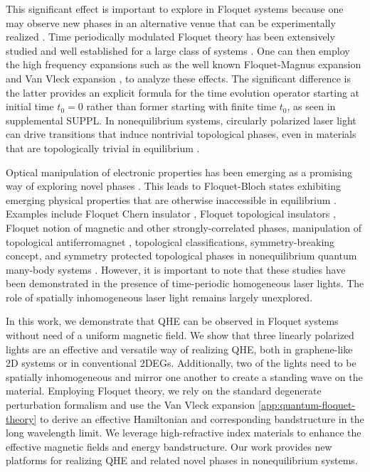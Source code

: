 \documentclass[aps,prb,twocolumn,showpacs,superscriptaddress]{revtex4-2}
\begin{document}
This significant effect is important to explore in Floquet systems \cite{NHL, AEE} because one may observe new phases in an alternative venue that can be experimentally realized \cite{MCR, YHW, HZJ, JWM,merboldtObservationFloquetStates2024, choiDirectObservationFloquetBloch2025}.
Time periodically modulated Floquet theory has been extensively studied and well established for a large class of systems \cite{JHS,HSA,MGP,MBL,AEE,NGJ}.
One can then employ the high frequency expansions \cite{MBL,AEE,NGJ,SRI,API,TMS,ESM,TKT,ALA} such as the well known Floquet-Magnus expansion \cite{ESM,TKT,ALA,FCA} and Van Vleck expansion \cite{MBL,AEE}, to analyze these effects.
The significant difference is the latter provides an explicit formula for the time evolution operator starting at initial time $t_{0}=0$ rather than former starting with finite time $t_{0}$, as seen in supplemental SUPPL.
In nonequilibrium systems, circularly polarized laser light can drive transitions that induce nontrivial topological phases, even in materials that are topologically trivial in equilibrium \cite{TKO}.

Optical manipulation of electronic properties has been emerging as a promising way of exploring novel phases \cite{AKA, JHM}.
This leads to Floquet-Bloch states exhibiting emerging physical properties that are otherwise inaccessible in equilibrium \cite{LST}.
Examples include Floquet Chern insulator \cite{AGG}, Floquet topological insulators \cite{rudnerBandStructureEngineering2020}, Floquet notion of magnetic and other strongly-correlated phases\cite{rudnerBandStructureEngineering2020}, manipulation of topological antiferromagnet \cite{bielinskiFloquetBlochManipulation2025}, topological classifications, symmetry-breaking concept, and symmetry protected topological phases in nonequilibrium quantum many-body systems \cite{EKM, rudnerBandStructureEngineering2020}.
However, it is important to note that these studies have been demonstrated in the presence of time-periodic homogeneous laser lights.
The role of spatially inhomogeneous laser light \cite{SWP1, SWP2, SWP3, SWP4, SWP5} remains largely unexplored.

In this work, we demonstrate that QHE can be observed in Floquet systems without need of a uniform magnetic field.
We show that three linearly polarized lights are an effective and versatile way of realizing QHE, both in graphene-like 2D systems or in conventional 2DEGs.
Additionally, two of the lights need to be spatially inhomogeneous and mirror one another to create a standing wave on the material.
Employing Floquet theory, we rely on the standard degenerate perturbation formalism and use the Van Vleck expansion \ref{app:quantum-floquet-theory} \cite{MBL, AEE} to derive an effective Hamiltonian and corresponding bandstructure in the long wavelength limit.
We leverage high-refractive index materials \cite{shimFundamentalLimitsRefractive2021} to enhance the effective magnetic fields and energy bandstructure.
Our work provides new platforms for realizing QHE and related novel phases in nonequilibrium systems.
\end{document}

